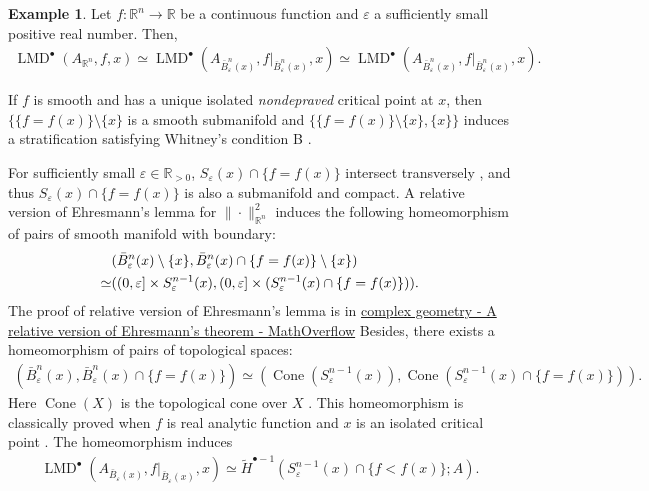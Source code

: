 \documentclass[a4paper,dvipdfmx,reqno,12pt]{amsart}
\theoremstyle{definition}
\newtheorem{example}[theorem]{Example}
\newcommand{\opn}[1]{\operatorname{#1}}
\numberwithin{equation}{section}
\begin{document}
\begin{example}
Let $f\colon \mathbb{R}^{n}\to \mathbb{R}$ be a 
continuous function and 
$\varepsilon$ a 
sufficiently small positive real number. Then, 
\begin{align}
\opn{LMD}^{\bullet}(A_{\mathbb{R}^{n}},f,x)\simeq 
\opn{LMD}^{\bullet}(A_{\bar{B}_{\varepsilon}^{n}(x)},
f|_{\bar{B}_{\varepsilon}^{n}(x)},x) \simeq 
\opn{LMD}^{\bullet}(A_{\bar{B}_{\varepsilon}^{n}(x)},
f|_{\bar{B}_{\varepsilon}^{n}(x)},x).
\end{align}

If $f$ is smooth and has a unique isolated \emph{nondepraved} 
critical point at $x$, then 
$\{\{f=f(x)\}\setminus \{x\}$ is a smooth submanifold 
and $\{\{f=f(x)\}\setminus \{x\},\{x\} \}$ induces 
a stratification satisfying Whitney's condition B
\cite[Part I.2.5.1. Lemma]{MR932724}. 

For sufficiently small $\varepsilon\in \mathbb{R}_{> 0}$, 
$S_{\varepsilon}(x) \cap \{f=f(x)\}$ 
intersect transversely \cite[Part I.3.5.1. Lemma]{MR932724},
and thus $S_{\varepsilon}(x) \cap \{f=f(x)\}$
is also a submanifold and compact.
A relative version of Ehresmann's lemma for 
$\|\cdot\|_{\mathbb{R}^{n}}^2$ induces the 
following homeomorphism of pairs of smooth manifold 
with boundary:
\begin{align}
&(\bar{B}_{\varepsilon}^{n}(x)\setminus \{x\}, 
 \bar{B}_{\varepsilon}^{n}(x)\cap \{f=f(x)\} \setminus \{x\}) \\ 
\simeq & ((0,\varepsilon] \times S_{\varepsilon}^{n-1}(x),
(0,\varepsilon] \times
(S_{\varepsilon}^{n-1}(x) \cap \{f=f(x)\})). \notag
\end{align}
The proof of relative version of Ehresmann's lemma is 
in \cite{359708}
\href{https://mathoverflow.net/questions/358543/a-relative-version-of-ehresmanns-theorem}{complex geometry - A relative version of Ehresmann's theorem - MathOverflow}
Besides, there exists a homeomorphism of pairs of
topological spaces:
\begin{align}
(\bar{B}_{\varepsilon}^{n}(x),
\bar{B}_{\varepsilon}^{n}(x)\cap \{f=f(x)\})
\simeq (\opn{Cone}(S_{\varepsilon}^{n-1}(x)),
\opn{Cone}(S_{\varepsilon}^{n-1}(x) \cap \{f=f(x)\})).
\end{align}
Here $\opn{Cone}(X)$ is the topological cone over
$X$ \cite[Example 4.4]{hatcherAlgebraicTopology2002a}.
This homeomorphism is classically proved when 
$f$ is real analytic function and $x$ is an 
isolated critical point
\cite[Theorem 2.10]{MR0239612}.
The homeomorphism induces 
\begin{align}
\opn{LMD}^{\bullet}(A_{\bar{B}_{\varepsilon}(x)},
f|_{\bar{B}_{\varepsilon}(x)},x)\simeq 
\tilde{H}^{\bullet-1}(S_{\varepsilon}^{n-1}(x)
\cap \{f<f(x)\};A).
\end{align}


\end{example}
\end{document}
